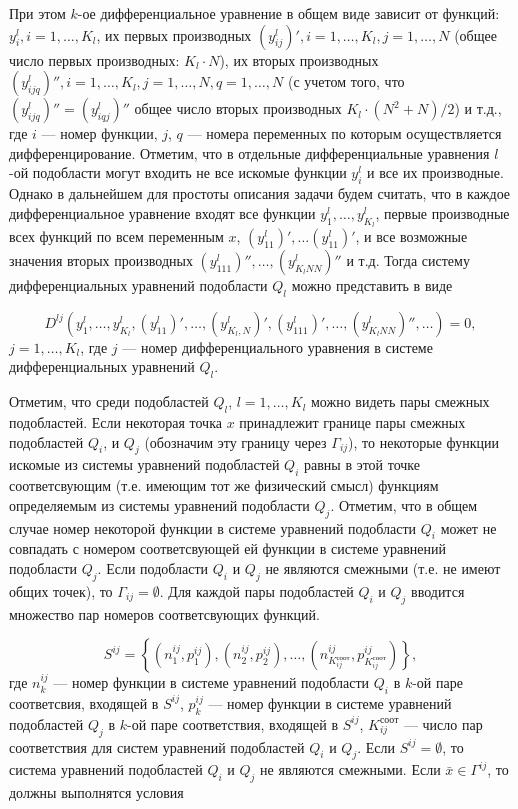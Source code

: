 \documentclass[a4paper,12pt]{article}
\begin{document}
При этом $k$-ое дифференциальное уравнение в общем виде зависит от функций:
$y^l_i, i = 1,\ldots,K_l$, их первых производных $(y^l_{ij})', i =
1,\ldots,K_l, j = 1, \ldots, N$ (общее число первых производных: $K_l \cdot
N$), их вторых производных $(y^l_{ijq})'', i = 1,\ldots,K_l, j =
1,\ldots,N, q = 1,\ldots,N$ (с учетом того, что $(y^l_{ijq})'' =
(y^l_{iqj})''$ общее число вторых производных $K_l \cdot (N^2+N) / 2$) и
т.д., где $i$ --- номер функции, $j$, $q$ --- номера переменных по которым
осуществляется дифференцирование. Отметим, что в отдельные дифференциальные
уравнения $l$-ой подобласти могут входить не все искомые функции $y^l_i$ и
все их производные.  Однако в дальнейшем для простоты описания задачи будем
считать, что в каждое дифференциальное уравнение входят все функции
$y^l_1,\ldots,y^l_{K_l}$, первые производные всех функций по всем
переменным $x$, $(y^l_{11})', \ldots (y^l_{11})'$, и все возможные значения
вторых производных $(y^l_{111})'', \ldots, (y^l_{K_lNN})''$ и т.д. Тогда
систему дифференциальных уравнений подобласти $Q_l$ можно представить в 
виде

\begin{equation}
    D^{lj}(y^l_1,\ldots,y^l_{K_l}, (y^l_{11})',\ldots, (y^l_{K_l,N})',
           (y^l_{111})',\ldots, (y^l_{K_lNN})'',\ldots) = 0,
    \label{eq:pde}
\end{equation}
$j = 1, \ldots, K_l$, где $j$ --- номер дифференциального уравнения в 
системе дифференциальных уравнений $Q_l$.

Отметим, что среди подобластей $Q_l$, $l=1,\ldots,K_l$ можно видеть пары
смежных подобластей. Если некоторая точка $x$ принадлежит границе пары
смежных подобластей $Q_i$, и $Q_j$ (обозначим эту границу через
$\Gamma_{ij}$), то некоторые функции искомые из системы уравнений
подобластей $Q_i$ равны в этой точке соответсвующим (т.е. имеющим тот же
физический смысл) функциям определяемым из системы уравнений подобласти
$Q_j$. Отметим, что в общем случае номер некоторой функции в системе
уравнений подобласти $Q_i$ может не совпадать с номером соответсвующей ей
функции в системе уравнений подобласти $Q_j$. Если подобласти $Q_i$ и $Q_j$
не являются смежными (т.е. не имеют общих точек), то $\Gamma_{ij} =
\emptyset$. Для каждой пары подобластей $Q_i$ и $Q_j$ вводится множество
пар номеров соответсвующих функций.

\begin{equation}
    S^{ij}=\left\{(n^{ij}_1,p^{ij}_1),(n^{ij}_2,p^{ij}_2),
    \ldots,(n^{ij}_{K^{соот}_{ij}},p^{ij}_{K^{соот}_{ij}})\right\},
    \label{eq:set-nums}
\end{equation}
где $n^{ij}_k$ --- номер функции в системе уравнений подобласти $Q_i$
в $k$-ой паре соответсвия, входящей в $S^{ij}$, $p^{ij}_k$ --- номер 
функции в системе уравнений подобластей $Q_j$ в $k$-ой паре соответствия,
входящей в $S^{ij}$, $K^{соот}_{ij}$ --- число пар соответствия для 
систем уравнений подобластей $Q_i$ и $Q_j$. Если $S^{ij} = \emptyset$, то
система уравнений подобластей $Q_i$ и $Q_j$ не являются смежными. Если
$\bar{x} \in \Gamma^{ij}$, то должны выполнятся условия
\end{document}
